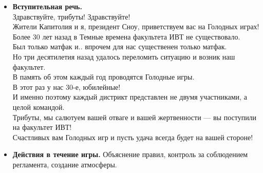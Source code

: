 
\begin{itemize}
\item \textbf{Вступительная речь.}\\
Здравствуйте, трибуты! Здравствуйте!\\
Жители Капитолия и я, президент Сноу, приветствуем вас на Голодных играх!\\
Более 30 лет назад в Темные времена факультета ИВТ не существовало.\\
Был только матфак и.. впрочем для нас существенен только матфак.\\
Но три десятилетия назад удалось переломить ситуацию и возник наш факультет.\\
В память об этом каждый год проводятся Голодные игры.\\
В этот раз у нас 30-е, юбилейные!\\
И именно поэтому каждый дистрикт представлен не двумя участниками, а целой командой.\\
Трибуты, мы салютуем вашей отваге и вашей жертвенности --- вы поступили на факультет ИВТ!\\
Счастливых вам Голодных игр и пусть удача всегда будет на вашей стороне!

\item \textbf{Действия в течение игры.} Объяснение правил, контроль за соблюдением регламента, создание атмосферы.
\end{itemize}